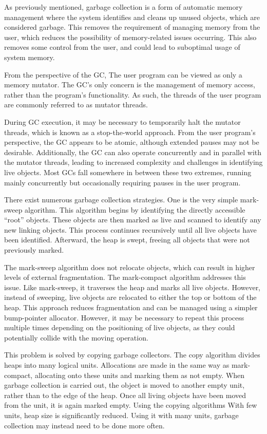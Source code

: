 As previously mentioned, garbage collection is a form of automatic memory management where the system identifies and cleans up unused objects, which are considered garbage. This removes the requirement of managing memory from the user, which reduces the possibility of memory-related issues occurring. This also removes some control from the user, and could lead to suboptimal usage of system memory.

From the perspective of the GC, The user program can be viewed as only a memory mutator. The GC's only concern is the management of memory access, rather than the program's functionality. As such, the threads of the user program are commonly referred to as mutator threads. 

During GC execution, it may be necessary to temporarily halt the mutator threads, which is known as a stop-the-world approach. From the user program's perspective, the GC appears to be atomic, although extended pauses may not be desirable. Additionally, the GC can also operate concurrently and in parallel with the mutator threads, leading to increased complexity and challenges in identifying live objects. Most GCs fall somewhere in between these two extremes, running mainly concurrently but occasionally requiring pauses in the user program.

There exist numerous garbage collection strategies. One is the very simple mark-sweep algorithm. This algorithm begins by identifying the directly accessible ``root'' objects. These objects are then marked as live and scanned to identify any new linking objects. This process continues recursively until all live objects have been identified. Afterward, the heap is swept, freeing all objects that were not previously marked.

The mark-sweep algorithm does not relocate objects, which can result in higher levels of external fragmentation. The mark-compact algorithm addresses this issue. Like mark-sweep, it traverses the heap and marks all live objects. However, instead of sweeping, live objects are relocated to either the top or bottom of the heap. This approach reduces fragmentation and can be managed using a simpler bump-pointer allocator. However, it may be necessary to repeat this process multiple times depending on the positioning of live objects, as they could potentially collide with the moving operation.

This problem is solved by copying garbage collectors. The copy algorithm divides heaps into many logical units. Allocations are made in the same way as mark-compact, allocating onto these units and marking them as not empty. When garbage collection is carried out, the object is moved to another empty unit, rather than to the edge of the heap. Once all living objects have been moved from the unit, it is again marked empty. Using the copying algorithms With few units, heap size is significantly reduced. Using it with many units, garbage collection may instead need to be done more often.

